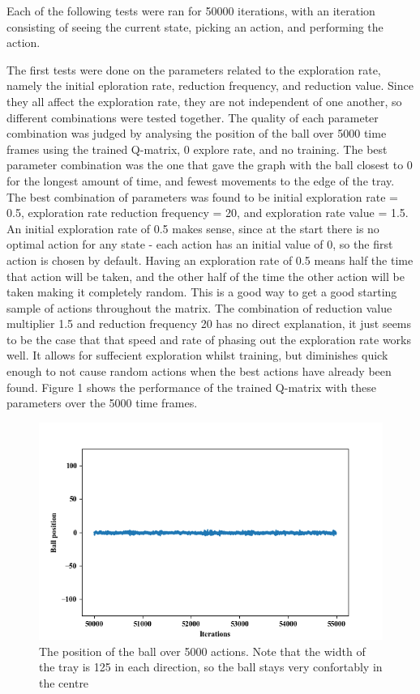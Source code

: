 \documentclass[12pt,a4paper]{article}
\begin{document}
Each of the following tests were ran for 50000 iterations, with an iteration consisting of seeing the current state, picking an action, and performing the action.

The first tests were done on the parameters related to the exploration rate, namely the initial eploration rate, reduction frequency, and reduction value. Since they all affect the exploration rate, they are not independent of one another, so different combinations were tested together. The quality of each parameter combination was judged by analysing the position of the ball over 5000 time frames using the trained Q-matrix, 0 explore rate, and no training. The best parameter combination was the one that gave the graph with the ball closest to 0 for the longest amount of time, and fewest movements to the edge of the tray. The best combination of parameters was found to be initial exploration rate = 0.5, exploration rate reduction frequency = 20, and exploration rate value = 1.5. An initial exploration rate of 0.5 makes sense, since at the start there is no optimal action for any state - each action has an initial value of 0, so the first action is chosen by default. Having an exploration rate of 0.5 means half the time that action will be taken, and the other half of the time the other action will be taken making it completely random. This is a good way to get a good starting sample of actions throughout the matrix. The combination of reduction value multiplier 1.5 and reduction frequency 20 has no direct explanation, it just seems to be the case that that speed and rate of phasing out the exploration rate works well. It allows for suffecient exploration whilst training, but diminishes quick enough to not cause random actions when the best actions have already been found. Figure 1 shows the performance of the trained Q-matrix with these parameters over the 5000 time frames.
\begin{figure}[H]
	\includegraphics{100_small}
	\caption{The position of the ball over 5000 actions. Note that the width of the tray is 125 in each direction, so the ball stays very confortably in the centre}
\end{figure}
\end{document}
